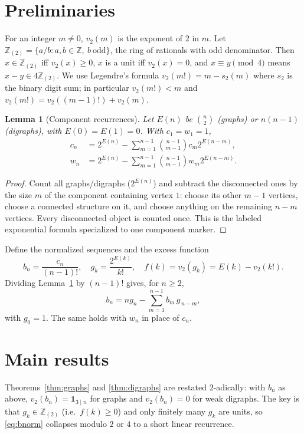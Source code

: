 \documentclass[11pt]{article}
\newtheorem{lemma}[theorem]{Lemma}
\theoremstyle{definition}
\begin{document}
\section{Preliminaries}
For an integer $m \ne 0$, $v_2(m)$ is the exponent of $2$ in $m$.
Let $\mathbb{Z}_{(2)} = \{a/b : a,b \in \mathbb{Z},\ b\ \mathrm{odd}\}$,
the ring of rationals with odd denominator. Then
$x \in \mathbb{Z}_{(2)}$ iff $v_2(x) \ge 0$, $x$ is a unit iff
$v_2(x)=0$, and $x \equiv y \pmod{4}$ means $x-y \in 4\mathbb{Z}_{(2)}$.
We use Legendre's formula $v_2(m!) = m - s_2(m)$ where $s_2$ is the
binary digit sum; in particular $v_2(m!) < m$ and
$v_2(m!) = v_2((m-1)!) + v_2(m)$.

\begin{lemma}[Component recurrences]\label{lem:rec}
Let $E(n)$ be $\binom{n}{2}$ (graphs) or $n(n-1)$ (digraphs), with
$E(0)=E(1)=0$. With $c_1=w_1=1$,
\begin{align*}
c_n &= 2^{E(n)} - \sum_{m=1}^{n-1}\binom{n-1}{m-1} c_m 2^{E(n-m)},\\
w_n &= 2^{E(n)} - \sum_{m=1}^{n-1}\binom{n-1}{m-1} w_m 2^{E(n-m)}.
\end{align*}
\end{lemma}
\begin{proof}
Count all graphs/digraphs ($2^{E(n)}$) and subtract the disconnected
ones by the size $m$ of the component containing vertex $1$:
choose its other $m-1$ vertices, choose a connected structure on it,
and choose anything on the remaining $n-m$ vertices. Every
disconnected object is counted once. This is the labeled exponential
formula specialized to one component marker.
\end{proof}

Define the normalized sequences and the excess function
\[
b_n = \frac{c_n}{(n-1)!}, \quad g_k = \frac{2^{E(k)}}{k!},
\quad f(k) = v_2(g_k) = E(k) - v_2(k!).
\]
Dividing Lemma~\ref{lem:rec} by $(n-1)!$ gives, for $n \ge 2$,
\begin{equation}\label{eq:bnorm}
b_n = n g_n - \sum_{m=1}^{n-1} b_m\, g_{\,n-m},
\end{equation}
with $g_0 = 1$. The same holds with $w_n$ in place of $c_n$.

\section{Main results}
Theorems~\ref{thm:graphs} and \ref{thm:digraphs} are restated
$2$-adically: with $b_n$ as above,
$v_2(b_n) = \mathbf{1}_{3\mid n}$ for graphs and $v_2(b_n)=0$ for weak
digraphs. The key is that $g_k \in \mathbb{Z}_{(2)}$ (i.e.\ $f(k)\ge 0$)
and only finitely many $g_k$ are units, so \eqref{eq:bnorm} collapses
modulo $2$ or $4$ to a short linear recurrence.
\end{document}
